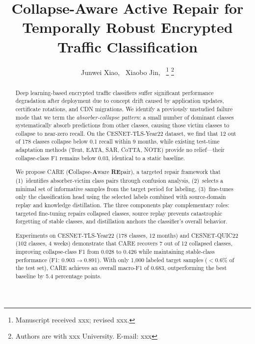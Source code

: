 \documentclass[journal]{IEEEtran}
\newcommand{\ours}{CARE}  %
\begin{document}
\title{Collapse-Aware Active Repair for Temporally Robust Encrypted Traffic Classification}

\author{
  Junwei Xiao,~\IEEEmembership{}
  Xiaobo Jin,~\IEEEmembership{}
  \thanks{Manuscript received xxx; revised xxx.}
  \thanks{Authors are with xxx University. E-mail: xxx}
}

\maketitle

\begin{abstract}
Deep learning-based encrypted traffic classifiers suffer significant performance degradation after deployment due to concept drift caused by application updates, certificate rotations, and CDN migrations.
We identify a previously unstudied failure mode that we term the \textit{absorber-collapse pattern}: a small number of dominant classes systematically absorb predictions from other classes, causing those victim classes to collapse to near-zero recall.
On the CESNET-TLS-Year22 dataset, we find that 12 out of 178 classes collapse below 0.1 recall within 9 months, while existing test-time adaptation methods (Tent, EATA, SAR, CoTTA, NOTE) provide no relief---their collapse-class F1 remains below 0.03, identical to a static baseline.

We propose \ours{} (\textbf{C}ollapse-\textbf{A}ware \textbf{RE}pair), a targeted repair framework that (1)~identifies absorber-victim class pairs through confusion analysis, (2)~selects a minimal set of informative samples from the target period for labeling, (3)~fine-tunes only the classification head using the selected labels combined with source-domain replay and knowledge distillation.
The three components play complementary roles: targeted fine-tuning repairs collapsed classes, source replay prevents catastrophic forgetting of stable classes, and distillation anchors the classifier's overall behavior.

Experiments on CESNET-TLS-Year22 (178 classes, 12 months) and CESNET-QUIC22 (102 classes, 4 weeks) demonstrate that \ours{} recovers 7 out of 12 collapsed classes, improving collapse-class F1 from 0.028 to 0.426 while maintaining stable-class performance (F1: 0.903$\to$0.891). With only 1{,}000 labeled target samples ($<$0.6\% of the test set), \ours{} achieves an overall macro-F1 of 0.683, outperforming the best baseline by 5.4 percentage points.
\end{abstract}
\end{document}
